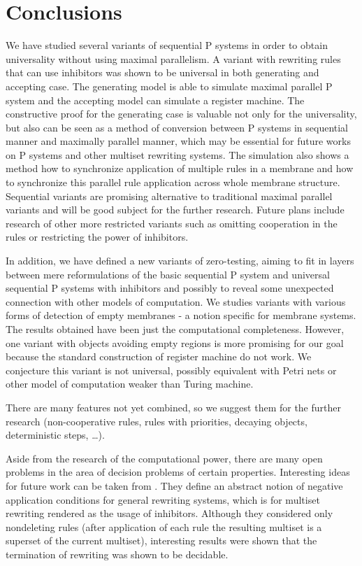 \chapter*{Conclusions}
We have studied several variants of sequential P systems in order to obtain universality without using maximal parallelism. A variant with rewriting rules that can use inhibitors was shown to be universal in both generating and accepting case. The generating model is able to simulate maximal parallel P system and the accepting model can simulate a register machine.
The constructive proof for the generating case is valuable not only for the universality, but also can be seen as a method of conversion between P systems in sequential manner and maximally parallel manner, which may be essential for future works on P systems and other multiset rewriting systems. The simulation also shows a method how to synchronize application of multiple rules in a membrane and how to synchronize this parallel rule application across whole membrane structure. Sequential variants are promising alternative to traditional maximal parallel variants and will be good subject for the further research. Future plans include research of other more restricted variants such as omitting cooperation in the rules or restricting the power of inhibitors.

In addition, we have defined a new variants of zero-testing, aiming to fit in layers between mere reformulations of the basic sequential P system and universal sequential P systems with inhibitors and possibly to reveal some unexpected connection with other models of computation. We studies variants with various forms of detection of empty membranes - a notion specific for membrane systems. The results obtained have been just the computational completeness. However, one variant with objects avoiding empty regions is more promising for our goal because the standard construction of register machine do not work. We conjecture this variant is not universal, possibly equivalent with Petri nets or other model of computation weaker than Turing machine.

There are many features not yet combined, so we suggest them for the further research (non-cooperative rules, rules with priorities, decaying objects, deterministic steps, \ldots).

Aside from the research of the computational power, there are many open problems in the area of decision problems of certain properties. Interesting ideas for future work can be taken from \cite{Bottoni06Inhibitors}. They define an abstract notion of negative application conditions for general rewriting systems, which is for multiset rewriting rendered as the usage of inhibitors. Although they considered only nondeleting rules (after application of each rule the resulting multiset is a superset of the current multiset), interesting results were shown that the termination of rewriting was shown to be decidable.

